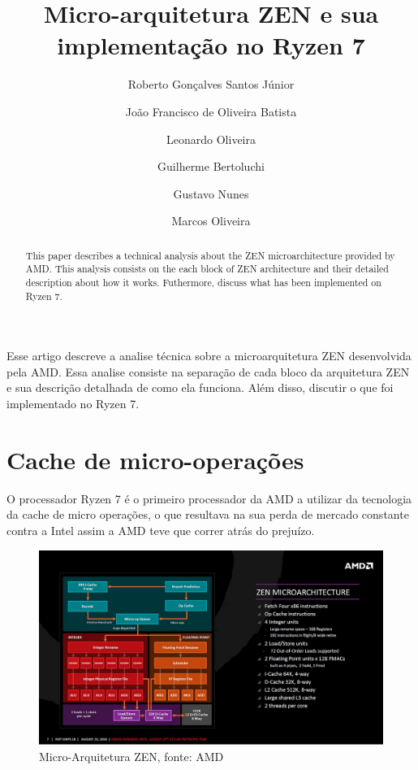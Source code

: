 \documentclass[12pt]{article}
\title{Micro-arquitetura ZEN e sua implementação no Ryzen 7}
\author{Roberto Gonçalves Santos Júnior \and João Francisco de Oliveira Batista 
\and Leonardo Oliveira \and Guilherme Bertoluchi \and Gustavo Nunes \and Marcos Oliveira}
\begin{document}
 

\maketitle
\thispagestyle{empty}
\newpage

\tableofcontents
\thispagestyle{empty}
\newpage

\begin{abstract}
  This paper describes a technical analysis about the ZEN microarchitecture provided by AMD. This analysis consists on the each block of ZEN architecture and their detailed description about how it works. Futhermore, discuss what has been implemented on Ryzen 7.
\end{abstract}

\begin{resumo}
  Esse artigo descreve a analise técnica sobre a microarquitetura ZEN desenvolvida pela AMD. Essa analise consiste na separação de cada bloco da arquitetura ZEN e sua descrição detalhada de como ela funciona. Além disso, discutir o que foi implementado no Ryzen 7. 
\end{resumo}

\thispagestyle{empty}
\newpage


\section{Cache de micro-operações}

O processador Ryzen 7 é o primeiro processador da AMD a utilizar da tecnologia da cache de micro operações, o que resultava na sua perda de mercado constante contra a Intel assim a AMD teve que correr atrás do prejuízo.

\begin{figure}[H]
\centering
\includegraphics[width=120mm,scale=0.8]{micro-op_cache.jpg}
\caption{Micro-Arquitetura ZEN, fonte: AMD}
\label{fig:AMD CORE}
\end{figure}
\end{document}
